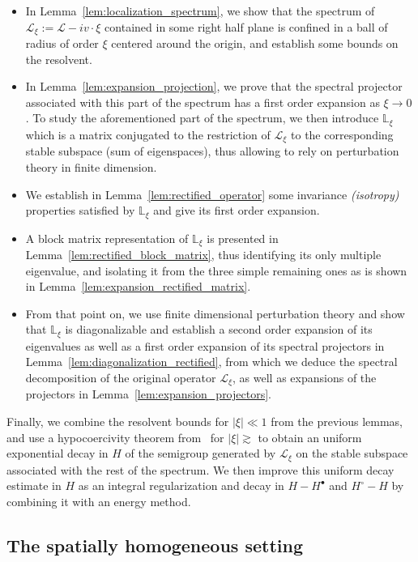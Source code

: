 \documentclass[10pt]{amsart}
\theoremstyle{definition}\newtheorem{defi}[theo]{Definition}\newtheorem{rema}[theo]{Remark}\newtheorem{exam}[theo]{Example}\newtheorem{exem}[theo]{Example}\newtheorem{nota}[theo]{Notation}
\newcommand{\rectL}{\mathbb{L}}
\newcommand{\LL}{\mathcal{L}}
\newcommand{\Ss}{H}
\newcommand{\Ssp}{H^{\bullet}}
\newcommand{\Ssm}{H^{\circ}}
\begin{document}
\begin{itemize}
\item In Lemma~\ref{lem:localization_spectrum}, we show that the spectrum of $\LL_\xi := \LL - i v \cdot \xi$ contained in some right half plane is confined in a ball of radius of order $\xi$ centered around the origin, and establish some bounds on the resolvent.
\item In Lemma~\ref{lem:expansion_projection}, we prove that the spectral projector associated with this part of the spectrum has a first order expansion as $\xi \to 0$. {To study the aforementioned part of the spectrum, we then introduce $\rectL_{ \xi}$ which is a matrix conjugated to the restriction of $\LL_\xi$ to the corresponding stable subspace (sum of eigenspaces)}, thus allowing to rely on perturbation theory in finite dimension.
\item We establish in Lemma~\ref{lem:rectified_operator} some invariance \emph{(isotropy)} properties satisfied by $\rectL_{ \xi}$ and give its first order expansion.
\item A block matrix representation of $\rectL_{ \xi}$ is presented in Lemma~\ref{lem:rectified_block_matrix}, thus identifying its only multiple eigenvalue, and isolating it from the three simple remaining ones as is shown in Lemma~\ref{lem:expansion_rectified_matrix}.
\item From that point on, we use finite dimensional perturbation theory and show that $\rectL_{ \xi}$ is diagonalizable and establish a second order expansion of its eigenvalues as well as a first order expansion of its spectral projectors in Lemma~\ref{lem:diagonalization_rectified}, from which we deduce the spectral decomposition of the original operator $\LL_\xi$, as well as expansions of the projectors in Lemma~\ref{lem:expansion_projectors}.
\end{itemize}

Finally, we combine the resolvent bounds for $| \xi | \ll 1$ from the previous lemmas, and use a hypocoercivity theorem from~\cite{D2011} for $ | \xi | \gtrsim$ to obtain an uniform exponential decay in $\Ss$ of the semigroup generated by $\LL_\xi$ on the stable subspace associated with the rest of the spectrum. We then improve this uniform decay estimate in $\Ss$ as an {integral regularization and decay in $\Ss-\Ssp$ and $\Ssm-\Ss$} by combining it with an energy method.

\subsection{The spatially homogeneous setting}
\end{document}
